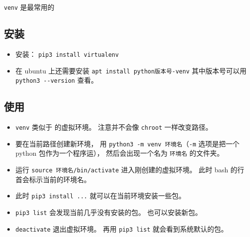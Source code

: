 
\begin{issues}
\issueDraft
\end{issues}


\verb`venv` 是最常用的

\subsection{安装}
\begin{itemize}
\item 安装： \verb`pip3 install virtualenv`
\item 在 ubuntu 上还需要安装 \verb`apt install python版本号-venv` 其中版本号可以用 \verb`python3 --version` 查看。
\end{itemize}

\subsection{使用}
\begin{itemize}
\item \verb`venv` 类似于  的虚拟环境。 注意并不会像 \verb`chroot` 一样改变路径。
\item 要在当前路径创建新环境， 用 \verb`python3 -m venv 环境名`（\verb`-m` 选项是把一个 python 包作为一个程序运）， 然后会出现一个名为 \verb`环境名` 的文件夹。
\item 运行 \verb`source 环境名/bin/activate` 进入刚创建的虚拟环境。 此时 bash 的行首会标示当前的环境名。
\item 此时 \verb`pip3 install ...` 就可以在当前环境安装一些包。
\item \verb`pip3 list` 会发现当前几乎没有安装的包。 也可以安装新包。
\item \verb`deactivate` 退出虚拟环境。 再用 \verb`pip3 list` 就会看到系统默认的包。
\end{itemize}
